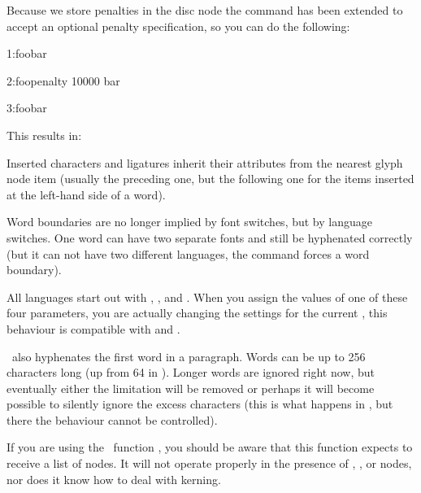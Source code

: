 Because we store penalties in the disc node the \type {\discretionary} command has
been extended to accept an optional penalty specification, so you can do the
following:

\startbuffer
{}
1:foo{\discretionary{}{}{}}bar\par
2:foo\discretionary penalty 10000 {}{}{}bar\par
3:foo\discretionary{}{}{}bar\par
\stopbuffer

\typebuffer

This results in:

\blank \start \getbuffer \stop \blank

Inserted characters and ligatures inherit their attributes from the nearest glyph
node item (usually the preceding one, but the following one for the items
inserted at the left-hand side of a word).

Word boundaries are no longer implied by font switches, but by language switches.
One word can have two separate fonts and still be hyphenated correctly (but it
can not have two different languages, the \type {\setlanguage} command forces a
word boundary).

All languages start out with , ,
 and . When you assign the
values of one of these four parameters, you are actually changing the settings
for the current \type {\language}, this behaviour is compatible with \type {\patterns}
and \type {\hyphenation}.

\LUATEX\ also hyphenates the first word in a paragraph. Words can be up to 256
characters long (up from 64 in ). Longer words are ignored right now, but
eventually either the limitation will be removed or perhaps it will become
possible to silently ignore the excess characters (this is what happens in
, but there the behaviour cannot be controlled).

If you are using the \LUA\ function , you should be aware
that this function expects to receive a list of  nodes. It will
not operate properly in the presence of , , or
 nodes, nor does it know how to deal with kerning.

\stopsection

\startsection[title={Applying ligatures and kerning}]

